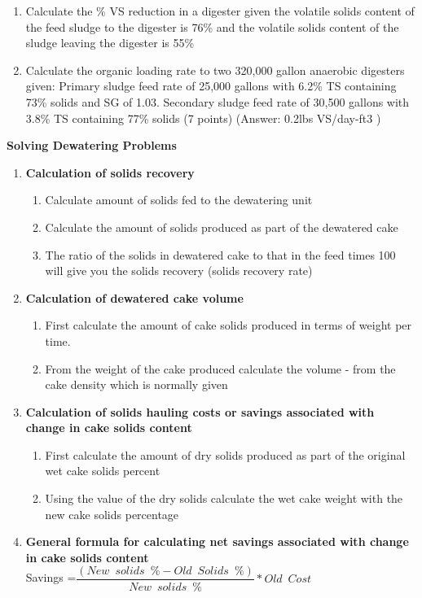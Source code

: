 \documentclass{article}
\begin{document}
\begin{enumerate}
\item Calculate the \% VS reduction in a digester given the volatile solids content of the feed sludge to the digester is 76\% and the volatile solids content of the sludge leaving the digester is 55\% 




\item Calculate the organic loading rate to two 320,000 gallon anaerobic digesters given:
Primary sludge feed rate of 25,000 gallons with 6.2\% TS containing 73\% solids and SG of 1.03.
Secondary sludge feed rate of 30,500 gallons with 3.8\% TS containing 77\% solids (7 points)
(Answer: 0.2lbs VS/day-ft3 ) 


\end{enumerate}
\textbf{Solving Dewatering Problems}
\begin{enumerate}
	\item \textbf{Calculation of solids recovery}\\
		\begin{enumerate}
		\item Calculate amount of solids fed to the dewatering unit
		\item Calculate the amount of solids produced as part of the dewatered cake
		\item The ratio of the solids in dewatered cake to that in the feed times 100 will give you the solids recovery (solids recovery rate)
		\end{enumerate}
	\item \textbf{Calculation of dewatered cake volume}\\
		\begin{enumerate}
		\item First calculate the amount of cake solids produced in terms of weight per time.
		\item From the weight of the cake produced calculate the volume - from the cake density which is normally given\\
		\end{enumerate}
	\item \textbf{Calculation of solids hauling costs or savings associated with change in cake solids content}\\
		\begin{enumerate}
		\item First calculate the amount of dry solids produced as part of the original wet cake solids percent
		\item Using the value of the dry solids calculate the wet cake weight with the new cake solids percentage\\
		\end{enumerate}
	\item \textbf{General formula for calculating net savings associated with change in cake solids content}\\
Savings =$ \dfrac {(New \enspace solids \enspace \%-Old \enspace Solids \enspace \%)}{New \enspace solids \enspace \%}*Old \enspace Cost$


\end{enumerate}
\end{document}
